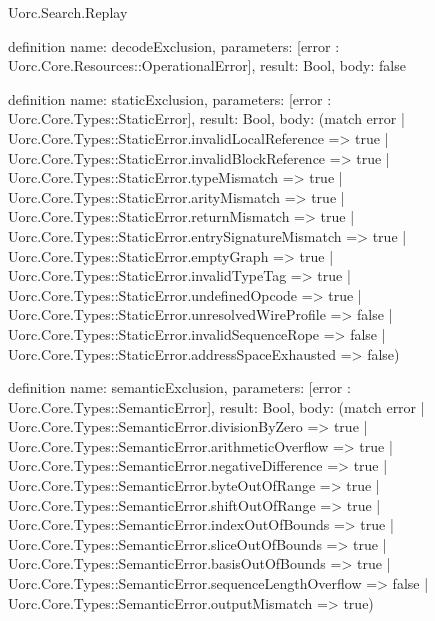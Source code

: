 \begin{lexlean}{Uorc.Search.Replay}
\begin{semanticmodule}
definition{
  name: decodeExclusion,
  parameters: [error : Uorc.Core.Resources::OperationalError],
  result: Bool,
  body: false
}

definition{
  name: staticExclusion,
  parameters: [error : Uorc.Core.Types::StaticError],
  result: Bool,
  body: (match error
    | Uorc.Core.Types::StaticError.invalidLocalReference => true
    | Uorc.Core.Types::StaticError.invalidBlockReference => true
    | Uorc.Core.Types::StaticError.typeMismatch => true
    | Uorc.Core.Types::StaticError.arityMismatch => true
    | Uorc.Core.Types::StaticError.returnMismatch => true
    | Uorc.Core.Types::StaticError.entrySignatureMismatch => true
    | Uorc.Core.Types::StaticError.emptyGraph => true
    | Uorc.Core.Types::StaticError.invalidTypeTag => true
    | Uorc.Core.Types::StaticError.undefinedOpcode => true
    | Uorc.Core.Types::StaticError.unresolvedWireProfile => false
    | Uorc.Core.Types::StaticError.invalidSequenceRope => false
    | Uorc.Core.Types::StaticError.addressSpaceExhausted => false)
}

definition{
  name: semanticExclusion,
  parameters: [error : Uorc.Core.Types::SemanticError],
  result: Bool,
  body: (match error
    | Uorc.Core.Types::SemanticError.divisionByZero => true
    | Uorc.Core.Types::SemanticError.arithmeticOverflow => true
    | Uorc.Core.Types::SemanticError.negativeDifference => true
    | Uorc.Core.Types::SemanticError.byteOutOfRange => true
    | Uorc.Core.Types::SemanticError.shiftOutOfRange => true
    | Uorc.Core.Types::SemanticError.indexOutOfBounds => true
    | Uorc.Core.Types::SemanticError.sliceOutOfBounds => true
    | Uorc.Core.Types::SemanticError.basisOutOfBounds => true
    | Uorc.Core.Types::SemanticError.sequenceLengthOverflow => false
    | Uorc.Core.Types::SemanticError.outputMismatch => true)
}


\end{semanticmodule}
\end{lexlean}
